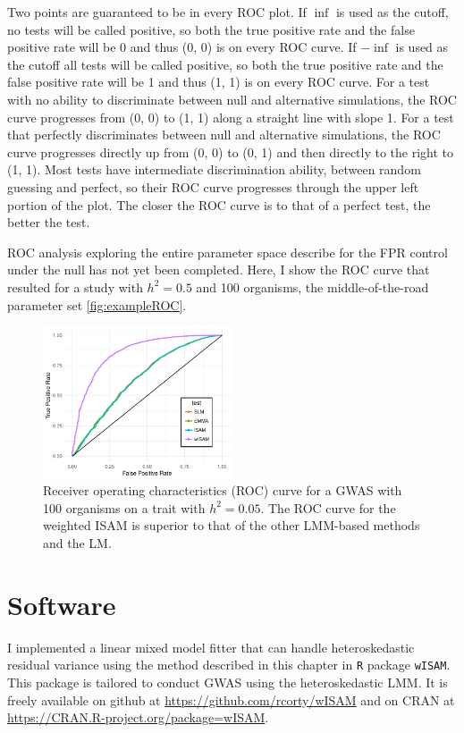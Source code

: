 Two points are guaranteed to be in every ROC plot.
If $\inf$ is used as the cutoff, no tests will be called positive, so both the true positive rate and the false positive rate will be 0 and thus (0, 0) is on every ROC curve.
If $-\inf$ is used as the cutoff all tests will be called positive, so both the true positive rate and the false positive rate will be 1 and thus (1, 1) is on every ROC curve.
For a test with no ability to discriminate between null and alternative simulations, the ROC curve progresses from (0, 0) to (1, 1) along a straight line with slope 1.
For a test that perfectly discriminates between null and alternative simulations, the ROC curve progresses directly up from (0, 0) to (0, 1) and then directly to the right to (1, 1).
Most tests have intermediate discrimination ability, between random guessing and perfect, so their ROC curve progresses through the upper left portion of the plot.
The closer the ROC curve is to that of a perfect test, the better the test.

ROC analysis exploring the entire parameter space describe for the FPR control under the null has not yet been completed.
Here, I show the ROC curve that resulted for a study with $h^2 = 0.5$ and 100 organisms, the middle-of-the-road parameter set \autoref{fig:exampleROC}.
\begin{figure}
  \centering
  \includegraphics[width = 0.5\textwidth]{images/roc_hetsked_100snps_1ksims_05h2_100strains.pdf}
  \caption[
    Receiver operating characteristics (ROC) curve for a GWAS with 100 organisms on a trait with $h^2 = 0.05$.
  ]
  {
    Receiver operating characteristics (ROC) curve for a GWAS with 100 organisms on a trait with $h^2 = 0.05$.
    The ROC curve for the weighted ISAM is superior to that of the other LMM-based methods and the LM.
  }
  \label{fig:exampleROC}
\end{figure}


\section{Software}

I implemented a linear mixed model fitter that can handle heteroskedastic residual variance using the method described in this chapter in \texttt{R} package \texttt{wISAM}.
This package is tailored to conduct GWAS using the heteroskedastic LMM.
It is freely available on github at \url{https://github.com/rcorty/wISAM} and on CRAN at \url{ https://CRAN.R-project.org/package=wISAM}.